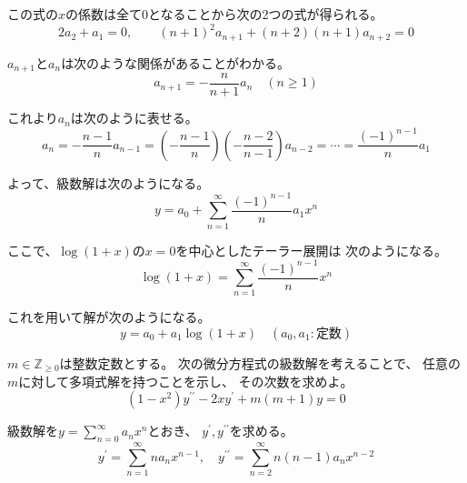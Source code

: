 \documentclass[12pt,b5paper]{ltjsarticle}
\begin{document}
\begin{enumerate}
      この式の$x$の係数は全て$0$となることから次の2つの式が得られる。
      \begin{equation}
       2a_2+a_1 =0
        ,\qquad
       (n+1)^2a_{n+1} + (n+2)(n+1)a_{n+2} =0
      \end{equation}

      $a_{n+1}$と$a_{n}$は次のような関係があることがわかる。
      \begin{equation}
       a_{n+1} = -\frac{n}{n+1}a_{n}  \quad (n\geq 1)
      \end{equation}

      これより$a_n$は次のように表せる。
      \begin{equation}
       a_n = -\frac{n-1}{n}a_{n-1} = \left(-\frac{n-1}{n}\right)\left(-\frac{n-2}{n-1}\right)a_{n-2}
        = \cdots =
        \frac{(-1)^{n-1}}{n}a_{1}
      \end{equation}

      よって、級数解は次のようになる。
      \begin{equation}
       y= a_0 + \sum_{n=1}^{\infty} \frac{(-1)^{n-1}}{n}a_{1} x^n
      \end{equation}

      ここで、$\log(1+x)$の$x=0$を中心としたテーラー展開は
      次のようになる。
      \begin{equation}
       \log(1+x) = \sum_{n=1}^{\infty} \frac{(-1)^{n-1}}{n} x^n
      \end{equation}

      これを用いて解が次のようになる。
      \begin{equation}
       y= a_0 + a_1 \log(1+x) \quad (a_0,a_1:\text{定数})
      \end{equation}


\end{enumerate}

\hrulefill

\newpage

$m\in\mathbb{Z}_{\geq 0}$は整数定数とする。
次の微分方程式の級数解を考えることで、
任意の$m$に対して多項式解を持つことを示し、
その次数を求めよ。
\begin{equation}
 (1-x^2)y^{\prime\prime}-2xy^{\prime}+m(m+1)y=0
  \label{pro3}
\end{equation}

\dotfill

級数解を$y=\sum_{n=0}^{\infty}a_nx^n$とおき、
$y^{\prime},y^{\prime\prime}$を求める。
\begin{equation}
 y^{\prime} = \sum_{n=1}^{\infty}na_nx^{n-1}
  ,\quad
  y^{\prime\prime} = \sum_{n=2}^{\infty}n(n-1)a_nx^{n-2}
\end{equation}
\end{document}
